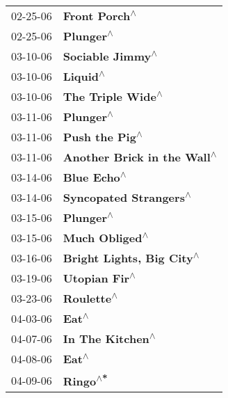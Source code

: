 \begin{supertabular}{p{0.25\columnwidth}p{0.75\columnwidth}}
 02-25-06 &                                     \textbf{Front Porch\textsuperscript{$\wedge$}} \\
 02-25-06 &                                         \textbf{Plunger\textsuperscript{$\wedge$}} \\
 03-10-06 &                                  \textbf{Sociable Jimmy\textsuperscript{$\wedge$}} \\
 03-10-06 &                                          \textbf{Liquid\textsuperscript{$\wedge$}} \\
 03-10-06 &                                 \textbf{The Triple Wide\textsuperscript{$\wedge$}} \\
 03-11-06 &                                         \textbf{Plunger\textsuperscript{$\wedge$}} \\
 03-11-06 &                                    \textbf{Push the Pig\textsuperscript{$\wedge$}} \\
 03-11-06 &                       \textbf{Another Brick in the Wall\textsuperscript{$\wedge$}} \\
 03-14-06 &                                       \textbf{Blue Echo\textsuperscript{$\wedge$}} \\
 03-14-06 &                            \textbf{Syncopated Strangers\textsuperscript{$\wedge$}} \\
 03-15-06 &                                         \textbf{Plunger\textsuperscript{$\wedge$}} \\
 03-15-06 &                                    \textbf{Much Obliged\textsuperscript{$\wedge$}} \\
 03-16-06 &                         \textbf{Bright Lights, Big City\textsuperscript{$\wedge$}} \\
 03-19-06 &                                     \textbf{Utopian Fir\textsuperscript{$\wedge$}} \\
 03-23-06 &                                        \textbf{Roulette\textsuperscript{$\wedge$}} \\
 04-03-06 &                                             \textbf{Eat\textsuperscript{$\wedge$}} \\
 04-07-06 &                                  \textbf{In The Kitchen\textsuperscript{$\wedge$}} \\
 04-08-06 &                                             \textbf{Eat\textsuperscript{$\wedge$}} \\
 04-09-06 &                                          \textbf{Ringo\textsuperscript{$\wedge$*}} \\

\end{supertabular}
